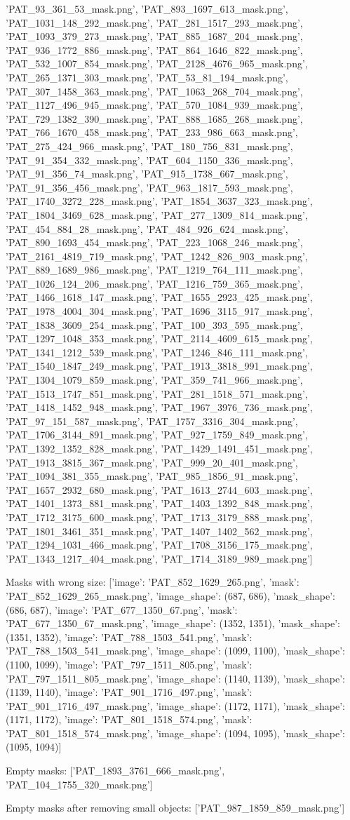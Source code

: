 'PAT_93_361_53_mask.png', 'PAT_893_1697_613_mask.png', 'PAT_1031_148_292_mask.png', 'PAT_281_1517_293_mask.png', 'PAT_1093_379_273_mask.png', 'PAT_885_1687_204_mask.png', 'PAT_936_1772_886_mask.png', 'PAT_864_1646_822_mask.png', 'PAT_532_1007_854_mask.png', 'PAT_2128_4676_965_mask.png', 'PAT_265_1371_303_mask.png', 'PAT_53_81_194_mask.png', 'PAT_307_1458_363_mask.png', 'PAT_1063_268_704_mask.png', 'PAT_1127_496_945_mask.png', 'PAT_570_1084_939_mask.png', 'PAT_729_1382_390_mask.png', 'PAT_888_1685_268_mask.png', 'PAT_766_1670_458_mask.png', 'PAT_233_986_663_mask.png', 'PAT_275_424_966_mask.png', 'PAT_180_756_831_mask.png', 'PAT_91_354_332_mask.png', 'PAT_604_1150_336_mask.png', 'PAT_91_356_74_mask.png', 'PAT_915_1738_667_mask.png', 'PAT_91_356_456_mask.png', 'PAT_963_1817_593_mask.png', 'PAT_1740_3272_228_mask.png', 'PAT_1854_3637_323_mask.png', 'PAT_1804_3469_628_mask.png', 'PAT_277_1309_814_mask.png', 'PAT_454_884_28_mask.png', 'PAT_484_926_624_mask.png', 'PAT_890_1693_454_mask.png', 'PAT_223_1068_246_mask.png', 'PAT_2161_4819_719_mask.png', 'PAT_1242_826_903_mask.png', 'PAT_889_1689_986_mask.png', 'PAT_1219_764_111_mask.png', 'PAT_1026_124_206_mask.png', 'PAT_1216_759_365_mask.png', 'PAT_1466_1618_147_mask.png', 'PAT_1655_2923_425_mask.png', 'PAT_1978_4004_304_mask.png', 'PAT_1696_3115_917_mask.png', 'PAT_1838_3609_254_mask.png', 'PAT_100_393_595_mask.png', 'PAT_1297_1048_353_mask.png', 'PAT_2114_4609_615_mask.png', 'PAT_1341_1212_539_mask.png', 'PAT_1246_846_111_mask.png', 'PAT_1540_1847_249_mask.png', 'PAT_1913_3818_991_mask.png', 'PAT_1304_1079_859_mask.png', 'PAT_359_741_966_mask.png', 'PAT_1513_1747_851_mask.png', 'PAT_281_1518_571_mask.png', 'PAT_1418_1452_948_mask.png', 'PAT_1967_3976_736_mask.png', 'PAT_97_151_587_mask.png', 'PAT_1757_3316_304_mask.png', 'PAT_1706_3144_891_mask.png', 'PAT_927_1759_849_mask.png', 'PAT_1392_1352_828_mask.png', 'PAT_1429_1491_451_mask.png', 'PAT_1913_3815_367_mask.png', 'PAT_999_20_401_mask.png', 'PAT_1094_381_355_mask.png', 'PAT_985_1856_91_mask.png', 'PAT_1657_2932_680_mask.png', 'PAT_1613_2744_603_mask.png', 'PAT_1401_1373_881_mask.png', 'PAT_1403_1392_848_mask.png', 'PAT_1712_3175_600_mask.png', 'PAT_1713_3179_888_mask.png', 'PAT_1801_3461_351_mask.png', 'PAT_1407_1402_562_mask.png', 'PAT_1294_1031_466_mask.png', 'PAT_1708_3156_175_mask.png', 'PAT_1343_1217_404_mask.png', 'PAT_1714_3189_989_mask.png']

Masks with wrong size:
[{'image': 'PAT_852_1629_265.png', 'mask': 'PAT_852_1629_265_mask.png', 'image_shape': (687, 686), 'mask_shape': (686, 687)}, {'image': 'PAT_677_1350_67.png', 'mask': 'PAT_677_1350_67_mask.png', 'image_shape': (1352, 1351), 'mask_shape': (1351, 1352)}, {'image': 'PAT_788_1503_541.png', 'mask': 'PAT_788_1503_541_mask.png', 'image_shape': (1099, 1100), 'mask_shape': (1100, 1099)}, {'image': 'PAT_797_1511_805.png', 'mask': 'PAT_797_1511_805_mask.png', 'image_shape': (1140, 1139), 'mask_shape': (1139, 1140)}, {'image': 'PAT_901_1716_497.png', 'mask': 'PAT_901_1716_497_mask.png', 'image_shape': (1172, 1171), 'mask_shape': (1171, 1172)}, {'image': 'PAT_801_1518_574.png', 'mask': 'PAT_801_1518_574_mask.png', 'image_shape': (1094, 1095), 'mask_shape': (1095, 1094)}]

Empty masks:
['PAT_1893_3761_666_mask.png', 'PAT_104_1755_320_mask.png']

Empty masks after removing small objects:
['PAT_987_1859_859_mask.png']
